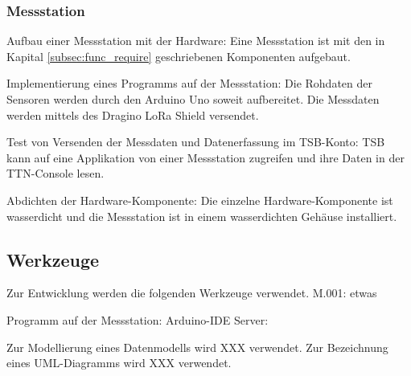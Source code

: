 \subsubsection{Messstation}
Aufbau einer Messstation mit der Hardware:
Eine Messstation ist mit den in Kapital \ref{subsec:func_require} geschriebenen Komponenten aufgebaut.

Implementierung eines Programms auf der Messstation:
Die Rohdaten der Sensoren werden durch den Arduino Uno soweit aufbereitet. Die Messdaten werden mittels des Dragino LoRa Shield versendet.

Test von Versenden der Messdaten und Datenerfassung im TSB-Konto:
TSB kann auf eine Applikation von einer Messstation zugreifen und ihre Daten in der TTN-Console lesen.

Abdichten der Hardware-Komponente:
Die einzelne Hardware-Komponente ist wasserdicht und die Messstation ist in einem wasserdichten Gehäuse installiert.

\subsection{Werkzeuge}


Zur Entwicklung werden die folgenden Werkzeuge verwendet.
M.001: etwas

Programm auf der Messstation: Arduino-IDE
Server:


Zur Modellierung eines Datenmodells wird XXX verwendet.
Zur Bezeichnung eines UML-Diagramms wird XXX verwendet.
